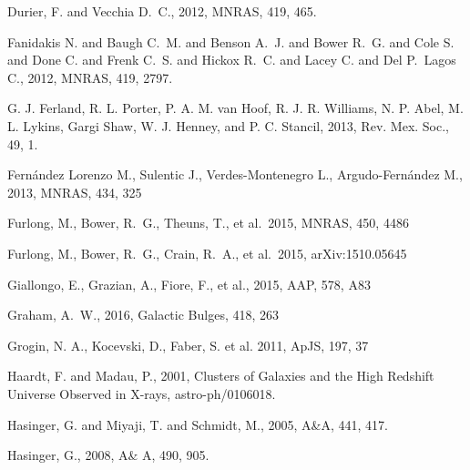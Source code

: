 \documentclass[a4paper,fleqn,usenatbib,letter]{mnras}
\begin{document}
\begin{thebibliography}{99}
Durier, F. and Vecchia D.~C., 2012, MNRAS, 419, 465.



 {Fanidakis} N. and {Baugh} C.~M. and {Benson} A.~J. and {Bower} R.~G. and 
{Cole} S. and {Done} C. and {Frenk} C.~S. and {Hickox} R.~C. and 
{Lacey} C. and {Del P.~Lagos} C., 2012, MNRAS, 419, 2797.


 
G. J. Ferland, R. L. Porter, P. A. M. van Hoof, R. J. R. Williams, N. P. Abel, M. L. Lykins, Gargi Shaw, W. J. Henney, and P. C. Stancil, 2013, Rev. Mex. Soc., 49, 1.

 Fern{\'a}ndez Lorenzo M., Sulentic J., Verdes-Montenegro L., Argudo-Fern{\'a}ndez M., 2013, MNRAS, 434, 325



Furlong, M., Bower, R.~G., Theuns, T., et al.\ 2015, MNRAS, 450, 4486   

Furlong, M., Bower, R.~G., Crain, R.~A., et al.\ 2015, arXiv:1510.05645

Giallongo, E., Grazian, A., Fiore, F., et al., 2015, AAP, 578, A83

Graham, A.~W., 2016, Galactic Bulges, 418, 263 

Grogin, N. A., Kocevski, D., Faber, S. et al. 2011, ApJS, 197, 37





{Haardt}, F. and {Madau}, P., 2001, Clusters of Galaxies and the High Redshift Universe Observed in X-rays, 
astro-ph/0106018. 


{Hasinger}, G. and {Miyaji}, T. and {Schmidt}, M., 2005, A\&A, 441, 417.

{Hasinger}, G., 2008, A\& A, 490, 905.



\end{thebibliography}
\end{document}
